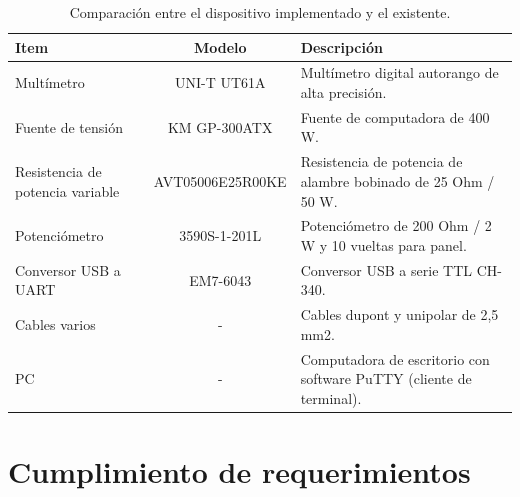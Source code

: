 \begin{table}[H]
	\centering
	\caption{Comparación entre el dispositivo implementado y el existente.}
	\begin{tabular}{p{3cm} c p{6cm}}
		\toprule
		\textbf{Item} & \textbf{Modelo} & \textbf{Descripción} \\
		\midrule
		Multímetro			& UNI-T UT61A		& Multímetro digital autorango de alta precisión. \\
		Fuente de tensión	& KM GP-300ATX		& Fuente de computadora de 400 W. \\
		Resistencia de potencia variable		& AVT05006E25R00KE	& Resistencia de potencia de alambre bobinado de 25 Ohm / 50 W. \\
		Potenciómetro							& 3590S-1-201L & Potenciómetro de 200 Ohm / 2 W y 10 vueltas para panel. \\
		Conversor USB a UART					& EM7-6043		& Conversor USB a serie TTL CH-340. \\
		Cables varios							& - 			& Cables dupont y unipolar de 2,5 mm2. \\
		PC										& -				& Computadora de escritorio con software PuTTY (cliente de terminal). \\
		\bottomrule
		\hline
	\end{tabular}
	\label{tab:comparacionDisp}
\end{table}

\section{Cumplimiento de requerimientos}

